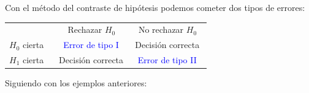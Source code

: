 Con el método del contraste de hipótesis podemos cometer dos tipos de errores:

\vspace{4mm}
\begin{definition}

	\begin{table}[H]
\centering
\begin{tabular}{cc|c}
 & $\ \ $ Rechazar $H_0\ \ \ $ & $\ \ $ No rechazar $H_0\ \ \ $ \\ \cline{2-3} 
\multicolumn{1}{c|}{$H_0$ cierta $\ \ $} & \textcolor{blue}{Error de tipo I} & Decisión correcta \\ \hline
\multicolumn{1}{c|}{$H_1$ cierta $\ \ $} & Decisión correcta &  \textcolor{blue}{Error de tipo II} 
\end{tabular}
\end{table}	
\end{definition}

\vspace{10mm}%
Siguiendo con los ejemplos anteriores:

